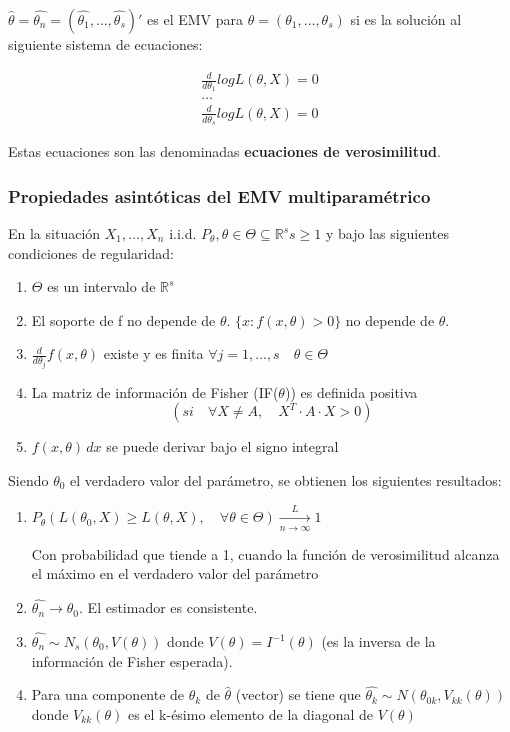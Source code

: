 $\widehat{\theta}=\widehat{\theta_n}=(\widehat{\theta_1},\dots,\widehat{\theta_s})'$ es el EMV para $\theta=(\theta_1,\dots,\theta_s)$
si es la solución al siguiente sistema de ecuaciones:

\[
\begin{matrix}
    \frac{d}{d \theta_1} log L(\theta,X)=0 \\
    \dots \\
    \frac{d}{d \theta_s} log L(\theta,X)=0
\end{matrix}
\]

Estas ecuaciones son las denominadas \textbf{ecuaciones de verosimilitud}.

\subsubsection*{Propiedades asintóticas del EMV multiparamétrico}

En la situación $X_1,\dots,X_n$ i.i.d. $P_\theta, \theta \in \Theta \subseteq \mathbb{R}^s s\geq1$
y bajo las siguientes condiciones de regularidad:

\begin{enumerate}
    \item $\Theta$ es un intervalo de $\mathbb{R}^s$
    \item El soporte de f no depende de $\theta$. $\{x:f(x,\theta)>0\}$ no depende de $\theta$.
    \item $\frac{d}{d \theta_j} f(x,\theta)$ existe y es finita $\forall j=1,\dots,s \quad \theta \in \Theta$
    \item La matriz de información de Fisher (IF($\theta$)) es definida positiva \[ (si \quad \forall X \neq A, \quad X^T \cdot A \cdot X >0) \]
    \item $f(x,\theta) \,dx$ se puede derivar bajo el signo integral
\end{enumerate}
\newpage
Siendo $\theta_0$ el verdadero valor del parámetro, se obtienen los siguientes resultados:

\begin{enumerate}
    \item $P_\theta(L(\theta_0,X)\geq L(\theta,X),\quad \forall \theta \in \Theta) \xrightarrow[n \to \infty]{L}1$
    
    Con probabilidad que tiende a 1, cuando la función de verosimilitud alcanza el máximo en el verdadero valor del parámetro
    \item $\widehat{\theta_n} \to \theta_0$. El estimador es consistente.
    \item $\widehat{\theta_n} \sim N_s(\theta_0,V(\theta))$ donde $V(\theta)=I^{-1}(\theta)$ (es la inversa de la información de Fisher esperada).
    \item Para una componente de $\widehat{\theta_k}$ de $\widehat{\theta}$ (vector) se tiene que $\widehat{\theta_k} \sim N(\theta_{0k},V_{kk}(\theta))$
    donde $V_{kk}(\theta)$ es el k-ésimo elemento de la diagonal de $V(\theta)$
\end{enumerate}

